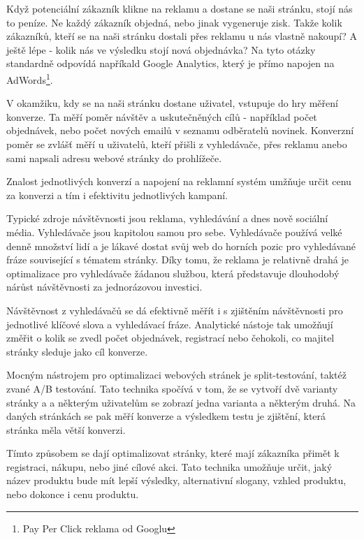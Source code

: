 \documentclass[bc,female,java,dept456]{diploma}						%
\begin{document}
Když potenciální zákazník klikne na reklamu a dostane se naši stránku, stojí nás to peníze. Ne každý zákazník objedná, nebo jinak vygeneruje zisk. Takže kolik zákazníků, kteří se na naši stránku dostali přes reklamu u nás vlastně nakoupí? A ještě lépe - kolik nás ve výsledku stojí nová objednávka? Na tyto otázky standardně odpovídá napříkald Google Analytics, který je přímo napojen na AdWords\footnote{Pay Per Click reklama od Googlu}.

V okamžiku, kdy se na naši stránku dostane uživatel, vstupuje do hry měření konverze. Ta měří poměr návštěv a uskutečněných cílů - například počet objednávek, nebo počet nových emailů v seznamu odběratelů novinek. Konverzní poměr se zvlášť měří u uživatelů, kteří přišli z vyhledávače, přes reklamu anebo sami napsali adresu webové stránky do prohlížeče.

Znalost jednotlivých konverzí a napojení na reklamní systém umžňuje určit cenu za konverzi a tím i efektivitu jednotlivých kampaní.



\bigskip


Typické zdroje návštěvnosti jsou reklama, vyhledávání a dnes nově sociální média. Vyhledávače jsou kapitolou samou pro sebe. Vyhledávače používá velké denně množství lidí a je lákavé dostat svůj web do horních pozic pro vyhledávané fráze související s tématem stránky. Díky tomu, že reklama je relativně drahá je optimalizace pro vyhledávače žádanou službou, která představuje dlouhodobý nárůst návštěvnosti za jednorázovou investici.

Návštěvnost z vyhledávačů se dá efektivně měřít i s zjištěním návštěvnosti pro jednotlivé klíčové slova a vyhledávací fráze. Analytické nástoje tak umožňují změřit o kolik se zvedl počet objednávek, registrací nebo čehokoli, co majitel stránky sleduje jako cíl konverze.



Mocným nástrojem pro optimalizaci webových stránek je split-testování, taktéž zvané A/B testování. Tato technika spočívá v tom, že se vytvoří dvě varianty stránky a a některým uživatelům se zobrazí jedna varianta a některým druhá. Na daných stránkách se pak měří konverze a výsledkem testu je zjištění, která stránka měla větší konverzi.

Tímto způsobem se dají optimalizovat stránky, které mají zákazníka přimět k registraci, nákupu, nebo jiné cílové akci. Tato technika umožňuje určit, jaký název produktu bude mít lepší výsledky, alternativní slogany, vzhled produktu, nebo dokonce i cenu produktu. 
\end{document}
